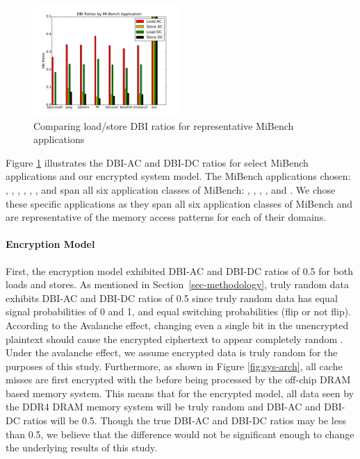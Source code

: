 \begin{figure}[!htb]
  \centering
  \includegraphics[width=0.5\textwidth]{figs/dbiGraph}
  \caption{Comparing load/store DBI ratios for representative MiBench applications}
  \label{fig:dbiGraph}
\end{figure}

Figure \ref{fig:dbiGraph} illustrates the DBI-AC and DBI-DC ratios for select
MiBench applications and our encrypted system model. The MiBench applications
chosen: , , , , ,
, and  span all six application classes of MiBench:
, , , ,  and
. We chose these specific applications as they span all six
application classes of MiBench and are representative of the memory access
patterns for each of their domains.

\paragraph{Encryption Model} First, the encryption model exhibited DBI-AC and
DBI-DC ratios of 0.5 for both loads and stores. As mentioned in
Section~\ref{sec-methodology}, truly random data exhibits DBI-AC and DBI-DC
ratios of 0.5 \cite{hollis} since truly random data has equal signal
probabilities of 0 and 1, and equal switching probabilities (flip or not flip).
According to the Avalanche effect, changing even a single bit in the
unencrypted plaintext should cause the encrypted ciphertext to appear
completely random \cite{avalance}. Under the avalanche effect, we assume
encrypted data is truly random for the purposes of this study. Furthermore, as
shown in Figure \ref{fig:sys-arch}, all cache misses are first encrypted with
the  before being processed by the off-chip DRAM based
memory system. This means that for the encrypted model, all data seen by the
DDR4 DRAM memory system will be truly random and DBI-AC and DBI-DC ratios will
be 0.5. Though the true DBI-AC and DBI-DC ratios may be less than 0.5, we
believe that the difference would not be significant enough to change the
underlying results of this study.

